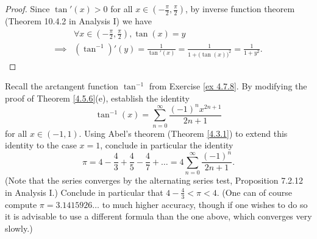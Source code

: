 \begin{proof}
    Since \(\tan'(x) > 0\) for all \(x \in (-\frac{\pi}{2}, \frac{\pi}{2})\), by inverse function theorem (Theorem 10.4.2 in Analysis I) we have
    \begin{align*}
                 & \forall x \in (-\frac{\pi}{2}, \frac{\pi}{2}), \tan(x) = y                                    \\
        \implies & (\tan^{-1})'(y) = \frac{1}{\tan'(x)} = \frac{1}{1 + \big(\tan(x)\big)^2} = \frac{1}{1 + y^2}.
    \end{align*}
\end{proof}

\begin{exercise}\label{ex 4.7.9}
    Recall the arctangent function \(\tan^{-1}\) from Exercise \ref{ex 4.7.8}.
    By modifying the proof of Theorem \ref{4.5.6}(e), establish the identity
    \[
        \tan^{-1}(x) = \sum_{n = 0}^\infty \frac{(-1)^n x^{2n + 1}}{2n + 1}
    \]
    for all \(x \in (-1, 1)\).
    Using Abel's theorem (Theorem \ref{4.3.1}) to extend this identity to the case \(x = 1\), conclude in particular the identity
    \[
        \pi = 4 - \frac{4}{3} + \frac{4}{5} - \frac{4}{7} + \dots = 4 \sum_{n = 0}^\infty \frac{(-1)^n}{2n + 1}.
    \]
    (Note that the series converges by the alternating series test, Proposition 7.2.12 in Analysis I.)
    Conclude in particular that \(4 - \frac{4}{3} < \pi < 4\).
    (One can of course compute \(\pi = 3.1415926 \dots\) to much higher accuracy, though if one wishes to do so it is advisable to use a different formula than the one above, which converges very slowly.)
\end{exercise}

